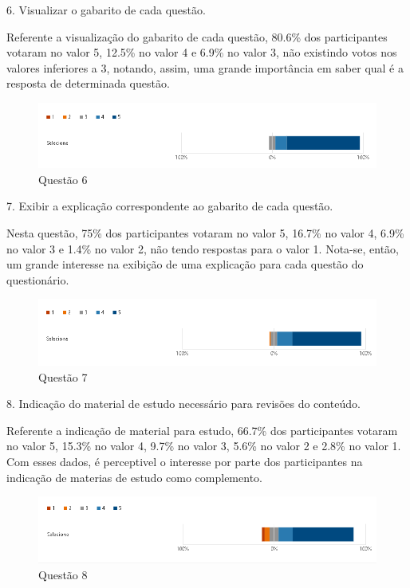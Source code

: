 6. Visualizar o gabarito de cada questão.

Referente a visualização do gabarito de cada questão, 80.6\% dos participantes votaram no valor 5, 12.5\% no valor 4 e 6.9\% no valor 3, não existindo votos nos valores inferiores a 3, notando, assim, uma grande importância em saber qual é a resposta de determinada questão.

\begin{figure}[H]
\centering
\includegraphics[scale=0.6]{figuras/6.png}
\caption{Questão 6}
\end{figure}

7. Exibir a explicação correspondente ao gabarito de cada questão.

Nesta questão, 75\% dos participantes votaram no valor 5, 16.7\% no valor 4, 6.9\% no valor 3 e 1.4\% no valor 2, não tendo respostas para o valor 1. Nota-se, então, um grande interesse na exibição de uma explicação para cada questão do questionário.

\begin{figure}[H]
\centering
\includegraphics[scale=0.6]{figuras/7.png}
\caption{Questão 7}
\end{figure}


8. Indicação do material de estudo necessário para revisões do conteúdo.

Referente a indicação de material para estudo, 66.7\% dos participantes votaram no valor 5, 15.3\% no valor 4, 9.7\% no valor 3, 5.6\% no valor 2 e 2.8\% no valor 1. Com esses dados, é perceptivel o interesse por parte dos participantes na indicação de materias de estudo como complemento.

\begin{figure}[H]
\centering
\includegraphics[scale=0.6]{figuras/8.png}
\caption{Questão 8}
\end{figure}

